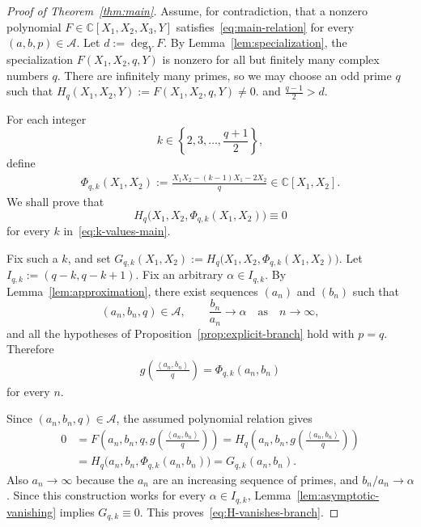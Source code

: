 \documentclass[10pt,a4paper]{amsart}
\newcommand{\CC}{\mathbb{C}}
\newcommand{\cA}{\mathcal{A}}
\newcommand{\gen}[1]{\left\langle #1\right\rangle}
\begin{document}
\begin{proof}[Proof of Theorem~\ref{thm:main}]
Assume, for contradiction, that a nonzero polynomial $F\in\CC[X_1,X_2,X_3,Y]$ satisfies~\cref{eq:main-relation} for every $(a,b,p)\in\cA$.  Let $d:=\deg_Y F$. By Lemma~\ref{lem:specialization}, the specialization
$F(X_1,X_2,q,Y)$ is nonzero for all but finitely many complex numbers $q$.
There are infinitely many primes, so we may choose an odd prime $q$ such that
$H_q(X_1,X_2,Y) :=F(X_1,X_2,q,Y)\neq 0$.
and $\frac{q-1}{2}>d$.

For each integer
\begin{equation}\label{eq:k-values-main}
  k\in\left\{2,3,\ldots,\frac{q+1}{2}\right\},
\end{equation}
define
\begin{align*}
\Phi_{q,k}(X_1,X_2):=\frac{X_1X_2-(k-1)X_1-2X_2}{q}\in\CC[X_1,X_2].
\end{align*}
We shall prove that
\begin{equation}\label{eq:H-vanishes-branch}
  H_q\bigl(X_1,X_2,\Phi_{q,k}(X_1,X_2)\bigr)\equiv0
\end{equation}
for every $k$ in~\cref{eq:k-values-main}.

Fix such a $k$, and set $G_{q,k}(X_1,X_2):=H_q\bigl(X_1,X_2,\Phi_{q,k}(X_1,X_2)\bigr)$.
Let $I_{q,k}:=(q-k,q-k+1)$.
Fix an arbitrary $\alpha\in I_{q,k}$.  By Lemma~\ref{lem:approximation}, there exist sequences $(a_n)$ and $(b_n)$ such
that
\[(a_n,b_n,q)\in\cA,\qquad\frac{b_n}{a_n}\longrightarrow\alpha\quad \text{as}\quad n\longrightarrow \infty,
\]
and all the hypotheses of Proposition~\ref{prop:explicit-branch} hold with
$p=q$.  Therefore
\begin{align*}
  g\!\left(\frac{\gen{a_n,b_n}}{q}\right) =\Phi_{q,k}(a_n,b_n)
\end{align*}
for every $n$.

Since $(a_n,b_n,q)\in\cA$, the assumed polynomial relation gives
\begin{align*}
0&=F\left(a_n,b_n,q,g\!\left(\frac{\gen{a_n,b_n}}{q}\right)\right)
=H_q\left(a_n,b_n,g\!\left(\frac{\gen{a_n,b_n}}{q}\right)\right)
\\& =H_q\bigl(a_n,b_n,\Phi_{q,k}(a_n,b_n)\bigr)
=G_{q,k}(a_n,b_n).
\end{align*}
Also $a_n\to\infty$ because the $a_n$ are an increasing sequence of primes,
and $b_n/a_n\to\alpha$.  Since this construction works for every
$\alpha\in I_{q,k}$, Lemma~\ref{lem:asymptotic-vanishing} implies $G_{q,k}\equiv0$.
This proves~\cref{eq:H-vanishes-branch}.


\end{proof}
\end{document}
